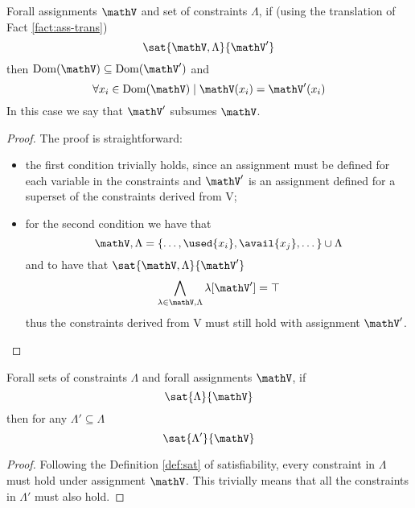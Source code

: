 \begin{lemma}
	\label{lemma:constr}
	Forall assignments $\mathV$ and set of constraints $\Lambda$, if (using the translation of Fact \ref{fact:ass-trans})
	$$ \sat{\mathV, \Lambda}{\mathV'} $$
	then $\mathrm{Dom}(\mathV) \subseteq \mathrm{Dom}(\mathV')$ and
	$$ \forall x_i \in \mathrm{Dom}(\mathV) \mid \mathV(x_i) = \mathV'(x_i) $$
	In this case we say that $\mathV'$ subsumes $\mathV$.
\end{lemma}
\begin{proof}
	The proof is straightforward: 
	\begin{itemize}
		\item the first condition trivially holds, since an assignment must be defined for each variable in the constraints and $\mathV'$ is an assignment defined for a superset of the constraints derived from V;
		\item for the second condition we have that
			$$ \mathV, \Lambda = \{ \dots, \used{x_i}, \avail{x_j}, \dots \} \cup \Lambda $$
		and to have that $ \sat{\mathV, \Lambda}{\mathV'} $
			$$ \bigwedge_{\lambda \in \mathV, \Lambda} \lambda[\mathV'] = \top $$
		thus the constraints derived from V must still hold with assignment $\mathV'$.
	\end{itemize}
\end{proof}
\begin{lemma}
	\label{lemma:subsume}
	Forall sets of constraints $\Lambda$ and forall assignments $\mathV$, if
	$$ \sat{\Lambda}{\mathV} $$
	then for any $\Lambda' \subseteq \Lambda$
	$$ \sat{\Lambda'}{\mathV} $$
\end{lemma}
\begin{proof}
	Following the Definition \ref{def:sat} of satisfiability, every constraint in $\Lambda$ must hold under assignment $\mathV$.
	This trivially means that all the constraints in $\Lambda'$ must also hold.
\end{proof}

